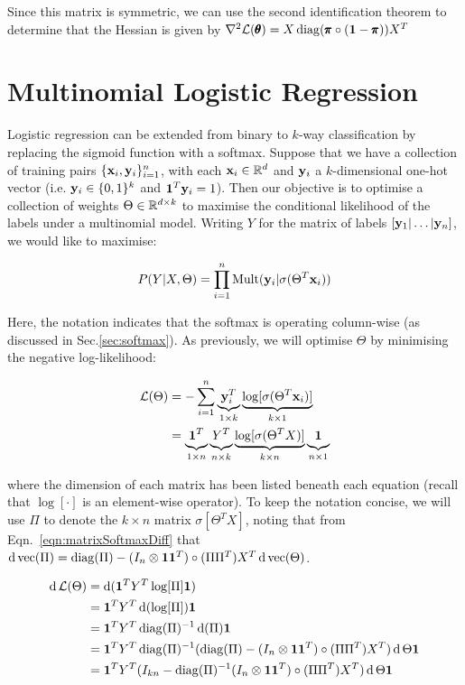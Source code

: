 Since this matrix is symmetric, we can use the second identification theorem \cite{magnus1988matrix} to determine that the Hessian is given by ${\nabla^2 \mathcal{L}(\pmb{\theta}) = X \operatorname{diag}(\pmb{\pi}\circ (\mathbf{1} - \pmb{\pi})) X^T}$

\section{Multinomial Logistic Regression}

Logistic regression can be extended from binary to $k$-way classification by replacing the sigmoid function with a softmax.  Suppose that we have a collection of training pairs $\{\mathbf{x}_i, \mathbf{y}_i\}_{i=1}^n$, with each $\mathbf{x}_i \in \mathbb{R}^d$ and $\mathbf{y}_i$ a $k$-dimensional one-hot vector (i.e. $\mathbf{y}_i \in \{0,1\}^k$ and $\mathbf{1}^T \mathbf{y}_i = 1$). Then our objective is to optimise a collection of weights $\Theta \in \mathbb{R}^{d \times k}$ to maximise the conditional likelihood of the labels under a multinomial model. Writing $Y$ for the matrix of labels $[\mathbf{y}_1 | \dots | \mathbf{y}_n]$, we would like to maximise:

\begin{align*}
  P(Y | X , \Theta) = \prod_{i=1}^n \text{Mult}(\mathbf{y}_i|\sigma(\Theta^T\mathbf{x}_i))
\end{align*}

Here, the notation indicates that the softmax is operating column-wise (as discussed in Sec.\ref{sec:softmax}).  As previously, we will optimise $\Theta$ by minimising the negative log-likelihood:

\begin{align*}
  \mathcal{L}(\Theta) &= -\sum_{i=1}^n \underbrace{\mathbf{y}_i^T}_{1 \times k} \underbrace{\log[\sigma(\Theta^T\mathbf{x}_i)]}_{k \times 1} \\
   &= \underbrace{\vphantom{[}\mathbf{1}^T}_{1 \times n} \underbrace{\vphantom{[}Y^T}_{n \times k} \underbrace{\log[\sigma(\Theta^T X)]}_{k \times n} \underbrace{\vphantom{[}\mathbf{1}}_{n \times 1} 
\end{align*}

where the dimension of each matrix has been listed beneath each equation (recall that $\log[\cdot]$ is an element-wise operator).  To keep the notation concise, we will use $\Pi$ to denote the $ k \times n$ matrix $\sigma[\Theta^T X]$, noting that from Eqn.~\ref{eqn:matrixSoftmaxDiff} that ${\operatorname{\text{d}} \operatorname{vec}(\Pi) = \operatorname{diag}(\Pi) - (I_n \otimes \mathbf{1} \mathbf{1}^T) \circ (\Pi\Pi^T)} X^T \operatorname{\text{d}} \operatorname{vec}(\Theta)$.


\begin{align}
\operatorname{\text{d}} \mathcal{L}(\Theta) &= \operatorname{\text{d}} (\mathbf{1}^T Y^T \log[\Pi] \mathbf{1}) \\
&= \mathbf{1}^T Y^T \operatorname{\text{d}}(\log[\Pi]) \mathbf{1}\\
&= \mathbf{1}^T Y^T \operatorname{diag}(\Pi)^{-1} \operatorname{\text{d}}(\Pi) \mathbf{1}\\
&= \mathbf{1}^T Y^T \operatorname{diag}(\Pi)^{-1} (\operatorname{diag}(\Pi) - (I_n \otimes \mathbf{1} \mathbf{1}^T) \circ (\Pi\Pi^T) X^T) \operatorname{\text{d}} \Theta  \mathbf{1}\\
&= \mathbf{1}^T Y^T (I_{kn} - \operatorname{diag}(\Pi)^{-1} (I_n \otimes \mathbf{1} \mathbf{1}^T) \circ (\Pi\Pi^T) X^T) \operatorname{\text{d}} \Theta  \mathbf{1}
\end{align}
